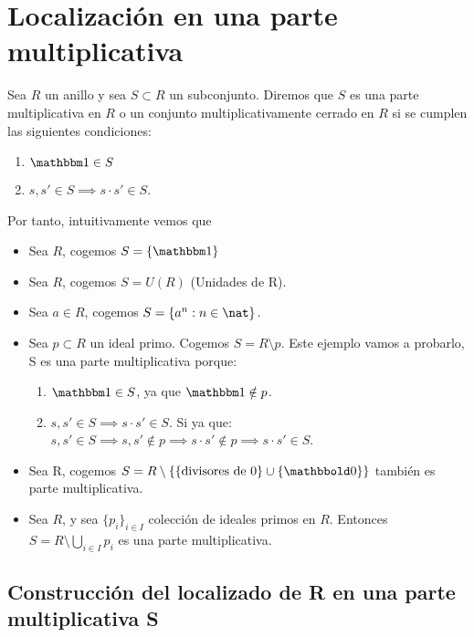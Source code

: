 \section{Localización en una parte multiplicativa}
\begin{defn}
	Sea $R$ un anillo y sea $S\subset R$ un subconjunto. Diremos que $S$ es una parte multiplicativa en $R$ o un conjunto multiplicativamente cerrado en $R$ si se cumplen las siguientes condiciones:
	\begin{enumerate}
		\item $\one \in S$
		\item $s,s' \in S \implies s\cdot s' \in S$.
	\end{enumerate}
\end{defn}

Por tanto, intuitivamente vemos que

\begin{example}
	\begin{itemize}
		\item Sea $R$, cogemos $S=\{\one \}$
		\item Sea $R$, cogemos $S=U(R)$ (Unidades de R).
		\item Sea $a \in R$, cogemos $S=\{ a^n: n \in \nat \}$.
		\item Sea $p \subset R$ un ideal primo. Cogemos $S=R \setminus p$. Este ejemplo vamos a probarlo, S es una parte multiplicativa porque:
		\begin{enumerate}
			\item $\one \in S$, ya que $\one \notin p$.
			\item $s,s' \in S \implies s\cdot s' \in S$. Si ya que: $s,s' \in S \implies s,s' \notin p \implies s\cdot s' \notin p \implies s\cdot s' \in S$.
		\end{enumerate}
		\item Sea R, cogemos $S= R \setminus \{\{ \text{divisores de 0}\}\cup \{ \zero \} \}$ también es parte multiplicativa.
		\item Sea $R$, y sea $\{p_i\}_{i\in I}$ colección de ideales primos en $R$. Entonces $S=R\setminus \bigcup_{i\in I}p_i$ es una parte multiplicativa.
	\end{itemize}
\end{example}

\subsection{Construcción del localizado de R en una parte multiplicativa S}

